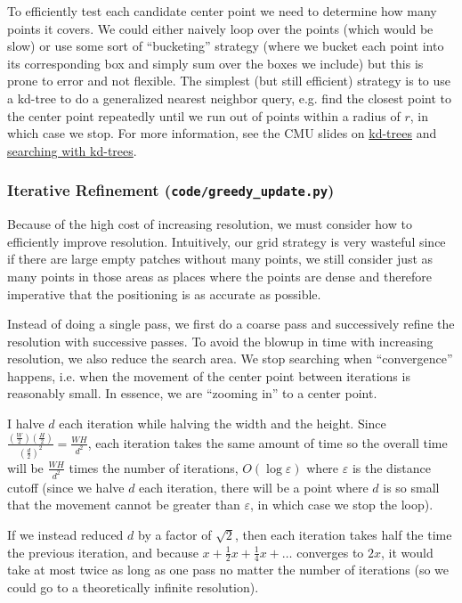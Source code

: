 \documentclass[11pt, oneside]{article}
\begin{document}
To efficiently test each candidate center point we need to determine
how many points it covers. We could either naively loop over the points
(which would be slow) or use some sort of \enquote{bucketing} strategy
(where we bucket each point into its corresponding box and simply sum
over the boxes we include) but this is prone to error and not flexible.
The simplest (but still efficient) strategy is to use a kd-tree to do a
generalized nearest neighbor query, e.g. find the closest point to the
center point repeatedly until we run out of points within a radius of \(
r \), in which case we stop. For more information, see the CMU slides on
\href{https://www.cs.cmu.edu/~ckingsf/bioinfo-lectures/kdtrees.pdf}{kd-trees}
and
\href{https://www.cs.cmu.edu/~ckingsf/bioinfo-lectures/kdrangenn.pdf}
{searching with kd-trees}.

\subsubsection{Iterative Refinement (\texttt{code/greedy\_update.py})}
Because of the high cost of increasing resolution, we must consider how to
efficiently improve resolution. Intuitively, our grid strategy is very wasteful
since if there are large empty patches without many points, we still consider
just as many points in those areas as places where the points are dense and
therefore imperative that the positioning is as accurate as possible.

Instead of doing a single pass, we first do a coarse pass and successively
refine the resolution with successive passes. To avoid the blowup in time with
increasing resolution, we also reduce the search area. We stop searching when
\enquote{convergence} happens, i.e. when the movement of the center point
between iterations is reasonably small. In essence, we are \enquote{zooming
in} to a center point.

I halve \( d \) each iteration while halving the width and the height. Since
\( \frac{(\frac{W}{2}) (\frac{H}{2})}{(\frac{d}{2})^2} = \frac{WH}{d^2} \),
each iteration takes the same amount of time so the overall time will be \(
\frac{WH}{d^2} \) times the number of iterations, \( O(\log \varepsilon) \)
where \( \varepsilon \) is the distance cutoff (since we halve \( d \) each
iteration, there will be a point where \( d \) is so small that the movement
cannot be greater than \( \varepsilon \), in which case we stop the loop).

If we instead reduced \( d \) by a factor of \( \sqrt 2 \), then each
iteration takes half the time the previous iteration, and because \( x
+ \frac{1}{2} x + \frac{1}{4} x + \dots \) converges to \( 2x \), it
would take at most twice as long as one pass no matter the number of
iterations (so we could go to a theoretically infinite resolution).
\end{document}
